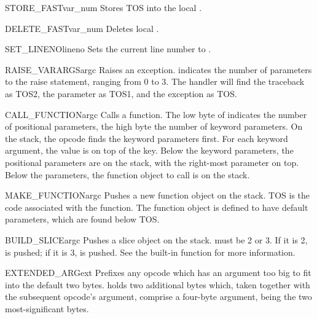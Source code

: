 \begin{opcodedesc}{STORE_FAST}{var_num}
Stores TOS into the local .
\end{opcodedesc}

\begin{opcodedesc}{DELETE_FAST}{var_num}
Deletes local .
\end{opcodedesc}

\begin{opcodedesc}{SET_LINENO}{lineno}
Sets the current line number to .
\end{opcodedesc}

\begin{opcodedesc}{RAISE_VARARGS}{argc}
Raises an exception.  indicates the number of parameters
to the raise statement, ranging from 0 to 3.  The handler will find
the traceback as TOS2, the parameter as TOS1, and the exception
as TOS.
\end{opcodedesc}

\begin{opcodedesc}{CALL_FUNCTION}{argc}
Calls a function.  The low byte of  indicates the number of
positional parameters, the high byte the number of keyword parameters.
On the stack, the opcode finds the keyword parameters first.  For each
keyword argument, the value is on top of the key.  Below the keyword
parameters, the positional parameters are on the stack, with the
right-most parameter on top.  Below the parameters, the function object
to call is on the stack.
\end{opcodedesc}

\begin{opcodedesc}{MAKE_FUNCTION}{argc}
Pushes a new function object on the stack.  TOS is the code associated
with the function.  The function object is defined to have 
default parameters, which are found below TOS.
\end{opcodedesc}

\begin{opcodedesc}{BUILD_SLICE}{argc}
Pushes a slice object on the stack.   must be 2 or 3.  If it
is 2,  is pushed; if it is 3,
 is pushed.
See the  built-in function for more
information.
\end{opcodedesc}

\begin{opcodedesc}{EXTENDED_ARG}{ext}
Prefixes any opcode which has an argument too big to fit into the
default two bytes.   holds two additional bytes which, taken
together with the subsequent opcode's argument, comprise a four-byte
argument,  being the two most-significant bytes.
\end{opcodedesc}

